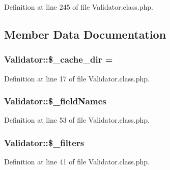 Definition at line 245 of file Validator.\+class.\+php.



\subsection{Member Data Documentation}
\subsubsection[{\texorpdfstring{\$\+\_\+cache\+\_\+dir}{$_cache_dir}}]{\setlength{\rightskip}{0pt plus 5cm}Validator\+::\$\+\_\+cache\+\_\+dir = \textquotesingle{}\textquotesingle{}}\hypertarget{classValidator_aaba7f33304aedded2c308120a0925e77}{}\label{classValidator_aaba7f33304aedded2c308120a0925e77}


Definition at line 17 of file Validator.\+class.\+php.

\subsubsection[{\texorpdfstring{\$\+\_\+field\+Names}{$_fieldNames}}]{\setlength{\rightskip}{0pt plus 5cm}Validator\+::\$\+\_\+field\+Names}\hypertarget{classValidator_a5689ec4c9687c826fc82902fa9b662d8}{}\label{classValidator_a5689ec4c9687c826fc82902fa9b662d8}


Definition at line 53 of file Validator.\+class.\+php.

\subsubsection[{\texorpdfstring{\$\+\_\+filters}{$_filters}}]{\setlength{\rightskip}{0pt plus 5cm}Validator\+::\$\+\_\+filters}\hypertarget{classValidator_ab86eb87cb828002c10d06be613d7b013}{}\label{classValidator_ab86eb87cb828002c10d06be613d7b013}


Definition at line 41 of file Validator.\+class.\+php.

